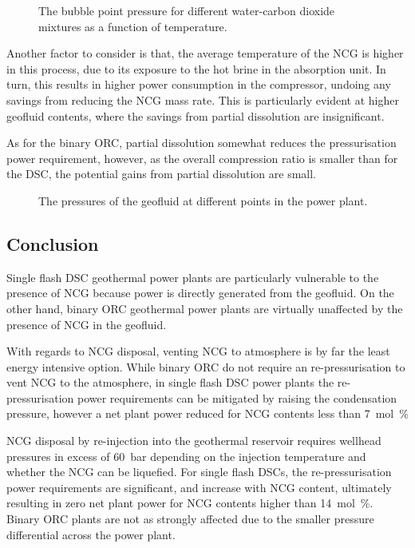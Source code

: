         \begin{figure}[H]
            \centering
            
            \caption{The bubble point pressure for different water-carbon dioxide mixtures as a function of temperature.}
            \label{fig:prosim_NCG_CarbFix_Solubility}
        \end{figure}

        Another factor to consider is that, the average temperature of the \ac{NCG} is higher in this process, due to its exposure to the hot brine in the absorption unit. In turn, this results in higher power consumption in the compressor, undoing any savings from reducing the \ac{NCG} mass rate. This is particularly evident at higher geofluid  contents, where the savings from partial dissolution are insignificant.

        As for the binary \ac{ORC}, partial dissolution somewhat reduces the pressurisation power requirement, however, as the overall compression ratio is smaller than for the \ac{DSC}, the potential gains from partial dissolution are small.

        \begin{figure}[H]
            \centering
            
            \caption{The pressures of the geofluid at different points in the power plant.}
            \label{fig:prosim_NCG_CarbFix_OPs}
        \end{figure}

\subsection{Conclusion}  
    Single flash DSC geothermal power plants are particularly vulnerable to the presence of \ac{NCG} because power is directly generated from the geofluid. On the other hand, binary \ac{ORC} geothermal power plants are virtually unaffected by the presence of \ac{NCG} in the geofluid.

    With regards to \ac{NCG} disposal, venting \ac{NCG} to atmosphere is by far the least energy intensive option. While binary \ac{ORC} do not require an re-pressurisation to vent \ac{NCG} to the atmosphere, in single flash \ac{DSC} power plants the re-pressurisation power requirements can be mitigated by raising the condensation pressure, however a net plant power reduced for NCG contents less than \qty{7}{\mol\percent}

    \ac{NCG} disposal by re-injection into the geothermal reservoir requires wellhead pressures in excess of \qty{60}{\bar} depending on the injection temperature and whether the NCG can be liquefied. For single flash \acp{DSC}, the re-pressurisation power requirements are significant, and increase with \ac{NCG} content, ultimately resulting in zero net plant power for \ac{NCG} contents higher than \qty{14}{\mol\percent}. Binary \ac{ORC} plants are not as strongly affected due to the smaller pressure differential across the power plant.
    
